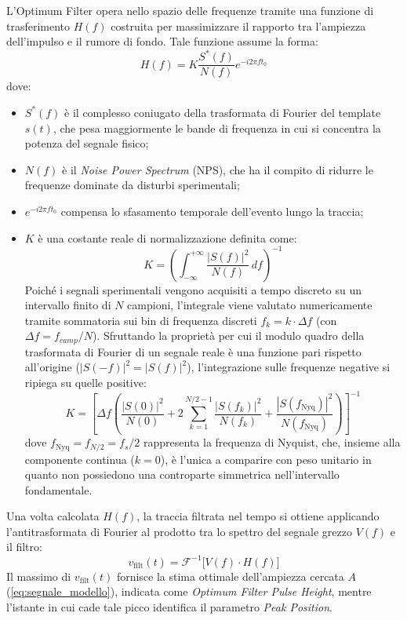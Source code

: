 L'Optimum Filter opera nello spazio delle frequenze tramite una funzione di trasferimento $H(f)$ costruita per massimizzare il rapporto tra l'ampiezza dell'impulso e il rumore di fondo. Tale funzione assume la forma:
\begin{equation}
    H(f) = K \frac{S^*(f)}{N(f)} e^{-i 2\pi f t_0}
    \label{eq:OF_transfer_function}
\end{equation}
dove:
\begin{itemize}
    \item $S^*(f)$ è il complesso coniugato della trasformata di Fourier del template $s(t)$, che pesa maggiormente le bande di frequenza in cui si concentra la potenza del segnale fisico;
    \item $N(f)$ è il \textit{Noise Power Spectrum} (NPS), che ha il compito di ridurre le frequenze dominate da disturbi sperimentali;
    \item $e^{-i 2\pi f t_0}$ compensa lo sfasamento temporale dell'evento lungo la traccia;
    \item $K$ è una costante reale di normalizzazione definita come:
    \begin{equation}
        K = \left( \int_{-\infty}^{+\infty} \frac{|S(f)|^2}{N(f)} \, df \right)^{-1}
        \label{eq:costante_normalizzazione}
    \end{equation}
    Poiché i segnali sperimentali vengono acquisiti a tempo discreto su un intervallo finito di $N$ campioni, l'integrale viene valutato numericamente tramite sommatoria sui bin di frequenza discreti $f_k = k \cdot \Delta f$ (con $\Delta f = f_{camp} / N$). Sfruttando la proprietà per cui il modulo quadro della trasformata di Fourier di un segnale reale è una funzione pari rispetto all'origine ($|S(-f)|^2 = |S(f)|^2$), l'integrazione sulle frequenze negative si ripiega su quelle positive:
    \begin{equation}
        K = \left[ \Delta f \left( \frac{|S(0)|^2}{N(0)} + 2 \sum_{k=1}^{N/2 - 1} \frac{|S(f_k)|^2}{N(f_k)} + \frac{|S(f_{\text{Nyq}})|^2}{N(f_{\text{Nyq}})} \right) \right]^{-1}
        \label{eq:costante_normalizzazione_discreta}
    \end{equation}
dove $f_{\text{Nyq}} = f_{N/2} = f_s / 2$ rappresenta la frequenza di Nyquist, che, insieme alla componente continua ($k=0$), è l'unica a comparire con peso unitario in quanto non possiedono una controparte simmetrica nell'intervallo fondamentale.
\end{itemize}

Una volta calcolata $H(f)$, la traccia filtrata nel tempo si ottiene applicando l'antitrasformata di Fourier al prodotto tra lo spettro del segnale grezzo $V(f)$ e il filtro:
\begin{equation}
    v_{\text{filt}}(t) = \mathcal{F}^{-1} \Big[ V(f) \cdot H(f) \Big]
\end{equation}
Il massimo di $v_{\text{filt}}(t)$ fornisce la stima ottimale dell'ampiezza cercata ${A}$ (\ref{eq:segnale_modello}), indicata come \textit{Optimum Filter Pulse Height}, mentre l'istante in cui cade tale picco identifica il parametro \textit{Peak Position}.


